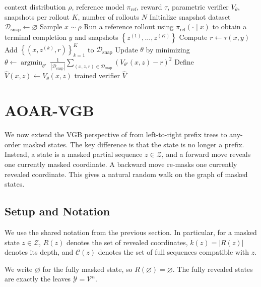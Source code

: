 \documentclass{article}
\numberwithin{theorem}{section}
\numberwithin{proposition}{section}
\numberwithin{corollary}{section}
\numberwithin{lemma}{section}
\numberwithin{conjecture}{section}
\numberwithin{remark}{section}
\numberwithin{definition}{section}
\numberwithin{assumption}{section}
\numberwithin{example}{section}
\newcommand{\calC}{{\mathcal{C}}}
\newcommand{\calD}{{\mathcal{D}}}
\newcommand{\calV}{{\mathcal{V}}}
\newcommand{\calY}{{\mathcal{Y}}}
\newcommand{\calZ}{{\mathcal{Z}}}
\newcommand{\mbra}[1]{\left\{#1\right\}}
\newcommand{\sbra}[1]{\left(#1\right)}
\newcommand{\abs}[1]{\left| #1\right|}
\providecommand{\base}{\pi_{\mathrm{ref}}}
\DeclareMathOperator*{\argmin}{argmin}
\begin{document}
\begin{algorithm}[t]
\caption{Training the shared masked-state verifier}
\label{alg:aoar_verifier_training}
\begin{algorithmic}[1]
\Require context distribution $\rho$, reference model $\base$, reward $\tau$, parametric verifier $V_\theta$, snapshots per rollout $K$, number of rollouts $N$
\State Initialize snapshot dataset $\calD_{\mathrm{snap}} \gets \varnothing$
    \State Sample $x\sim\rho$
    \State Run a reference rollout using $\base(\cdot\mid x)$ to obtain a terminal completion $y$ and snapshots $\mbra{z^{(1)},\dots,z^{(K)}}$
    \State Compute $r\gets\tau(x,y)$
    \State Add $\mbra{(x,z^{(k)},r)}_{k=1}^K$ to $\calD_{\mathrm{snap}}$
\EndFor
\State Update $\theta$ by minimizing
\Statex \hspace{\algorithmicindent}  $\displaystyle
\theta \gets \argmin_{\theta'}\
\frac{1}{|\calD_{\mathrm{snap}}|}
\sum_{(x,z,r)\in\calD_{\mathrm{snap}}}
\sbra{V_{\theta'}(x,z)-r}^2$
\State Define $\widehat V(x,z)\gets V_{\theta}(x,z)$
\State \Return trained verifier $\widehat V$
\end{algorithmic}
\end{algorithm}

\section{AOAR-VGB}
\label{app:sec:aoar_vgb}

We now extend the VGB perspective of \citet{rohatgi2025taming} from left-to-right prefix trees to any-order masked states. The key difference is that the state is no longer a prefix. Instead, a state is a masked partial sequence $z \in \calZ$, and a forward move reveals one currently masked coordinate. A backward move re-masks one currently revealed coordinate. This gives a natural random walk on the graph of masked states.

\subsection{Setup and Notation}
\label{app:subsec:aoar_setup}

We use the shared notation from the previous section. In particular, for a masked state $z \in \calZ$, $R(z)$ denotes the set of revealed coordinates, $k(z)=\abs{R(z)}$ denotes its depth, and $\calC(z)$ denotes the set of full sequences compatible with $z$.

We write $\varnothing$ for the fully masked state, so $R(\varnothing)=\varnothing$. The fully revealed states are exactly the leaves $\calY=\calV^n$.
\end{document}
